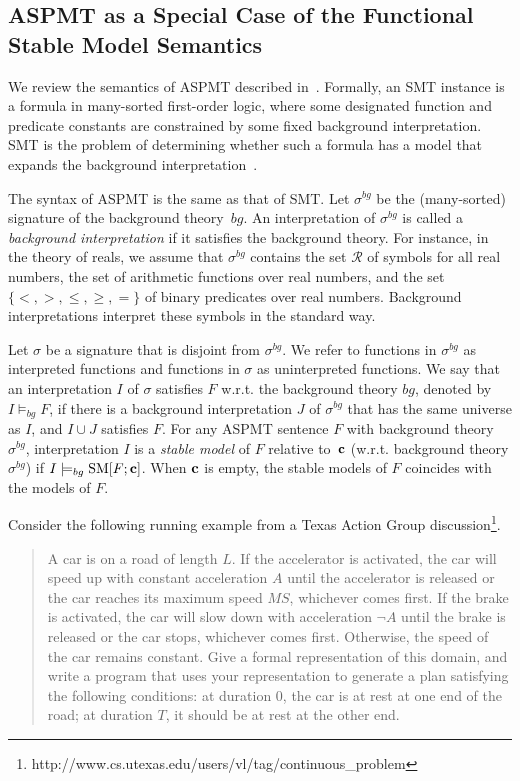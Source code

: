 \documentclass[runningheads]{llncs}
\def\sm{\hbox{\rm SM}}
\def\bC{{\bf{c}}}
\begin{document}
\subsection{ASPMT as a Special Case of the Functional Stable Model
  Semantics}  \label{ssec:aspmt}
We review the semantics of ASPMT described in~\cite{bartholomew13functional}.
Formally, an SMT instance is a formula in many-sorted first-order
logic, where some designated function and predicate constants are
constrained by some fixed background interpretation. SMT is the
problem of determining whether such a formula has a model that expands
the background interpretation~\cite{barrett09satisfiability}.

The syntax of ASPMT is the same as that of SMT. Let $\sigma^{bg}$ be
the (many-sorted) signature of the background theory~$bg$. An
interpretation of $\sigma^{bg}$ is called a {\em background
  interpretation} if it satisfies the background theory. For instance,
in the theory of reals, we assume that $\sigma^{bg}$ contains the set
$\mathcal{R}$ of symbols for all real numbers, the set of arithmetic
functions over real numbers, and the set $\{<, >, \le, \ge, =\}$ of
binary predicates over real numbers. Background interpretations
interpret these symbols in the standard way.

Let $\sigma$ be a signature that is disjoint from $\sigma^{bg}$.
We refer to functions in $\sigma^{bg}$ as interpreted functions and
functions in $\sigma$ as uninterpreted functions.
We say that an interpretation $I$ of $\sigma$ satisfies $F$
w.r.t. the background theory $bg$, denoted by $I\models_{bg} F$,
if there is a background interpretation $J$ of $\sigma^{bg}$ that has
the same universe as $I$, and $I\cup J$ satisfies $F$.
For any ASPMT sentence $F$ with background theory
$\sigma^{bg}$, interpretation $I$ is a {\em stable model} of $F$ relative
to~${\bf c}$ (w.r.t. background theory $\sigma^{bg}$) if
$I\models_{bg} \sm[F; \bC]$. When $\bC$ is empty, the stable models of
$F$ coincides with the models of $F$.


Consider the following running example from a Texas Action Group
discussion\footnote{http://www.cs.utexas.edu/users/vl/tag/continuous\_problem}.

\begin{quote}
A car is on a road of length $L$.  If the accelerator is activated, the
car will speed up with constant acceleration $A$ until the accelerator is
released or the car reaches its maximum speed $MS$, whichever comes first.
If the brake is activated, the car will slow down with acceleration
$\neg A$
until the brake is released or the car stops, whichever comes first.
Otherwise, the speed of the car remains constant.
Give a formal representation of this domain, and write a program that
uses your representation to generate a plan satisfying the following
conditions:  at duration 0, the car is at rest at one end of the road; at
duration $T$, it should be at rest at the other end.
\end{quote}
\end{document}
